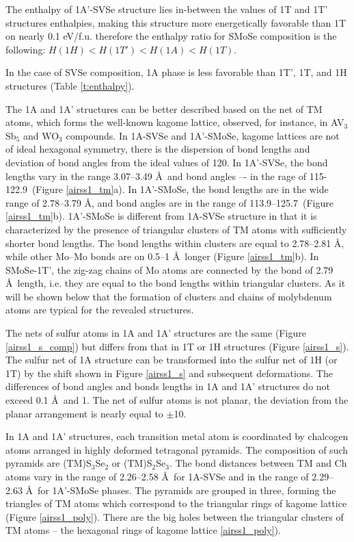 \documentclass[a4paperm]{article}
\begin{document}
The enthalpy of 1A'-SVSe structure lies in-between the values of 1T and 1T' structures enthalpies, making this structure more energetically favorable than 1T on nearly 0.1 eV/f.u. therefore the enthalpy ratio for SMoSe composition is the following: 
$H(1H) < H(1T') < H(1A) < H (1T)$.

In the case of SVSe composition, 1A phase is less favorable than 1T', 1T, and 1H structures (Table \ref{t:enthalpy}).



The 1A and 1A' structures can be better described based on the net of TM atoms, which forms the well-known kagome lattice\cite{zhang2021_kagome}, observed, for instance, in AV$_3$Sb$_5$ \cite{ortiz2021} and WO$_3$ \cite{gerand1979} compounds.
In 1A-SVSe and 1A'-SMoSe, kagome lattices are not of ideal hexagonal symmetry, there is the dispersion of bond lengths and deviation of bond angles from the ideal values of 120\textdegree.
In 1A'-SVSe, the bond lengths vary in the range 3.07--3.49 \AA\ and bond angles –- in the rage of 115-122.9\textdegree\ (Figure \ref{airss1_tm}a).
In 1A'-SMoSe, the bond lengths are in the wide range of 2.78--3.79 \AA, and bond angles are in the range of 113.9--125.7\textdegree\ (Figure \ref{airss1_tm}b).
1A'-SMoSe is different from 1A-SVSe structure in that it is characterized by the presence of triangular clusters of TM atoms with sufficiently shorter bond lengths.
The bond lengths within clusters are equal to 2.78--2.81 \AA, while other Mo--Mo bonds are on 0.5--1 \AA\ longer (Figure \ref{airss1_tm}b).
In SMoSe-1T', the zig-zag chains of Mo atoms are connected by the bond of 2.79 \AA\ length, i.e. they are equal to the bond lengths within triangular clusters.
As it will be shown below that the formation of clusters and chains of molybdenum atoms are typical for the revealed structures.

The nets of sulfur atoms in 1A and 1A' structures are the same (Figure \ref{airss1_s_comp}) but differs from that in 1T or 1H structures (Figure \ref{airss1_s}).
The sulfur net of 1A structure can be transformed into the sulfur net of 1H (or 1T) by the shift shown in Figure \ref{airss1_s} and subsequent deformations.
The differences of bond angles and bonds lengths in 1A and 1A' structures do not exceed 0.1 \AA\ and 1\textdegree.
The net of sulfur atoms is not planar, the deviation from the planar arrangement is nearly equal to $\pm$10\textdegree.

In 1A and 1A' structures, each transition metal atom is coordinated by chalcogen atoms arranged in highly deformed tetragonal pyramids.
The composition of such pyramids are (TM)S$_3$Se$_2$ or (TM)S$_2$Se$_3$.
The bond distances between TM and Ch atoms vary in the range of 2.26--2.58 \AA\ for 1A-SVSe and in the range of 2.29--2.63 \AA\ for 1A'-SMoSe phases. The pyramids are grouped in three, forming the triangles of TM atoms which correspond to the triangular rings of kagome lattice (Figure \ref{airss1_poly}).
There are the big holes between the triangular clusters of TM atoms -- the hexagonal rings of kagome lattice \ref{airss1_poly}).
\end{document}
